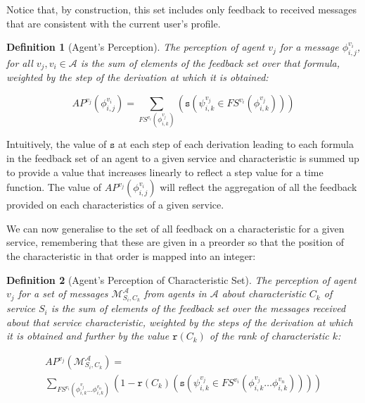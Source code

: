 \documentclass[compsoc, conference, letterpaper, 10pt, times]{IEEEtran}
\newtheorem{definition}{Definition}
\begin{document}
Notice that, by construction, this set includes only feedback to received messages that are consistent with the current user's profile. 

\begin{definition}[Agent's Perception]
The perception of agent $v_{j}$ for a message $\phi^{v_{i}}_{i,j}$, for all $v_{j}, v_{i} \in \mathcal{A}$ is the sum of elements of the feedback set over that formula, weighted by the step of the derivation at which it is obtained: 

\[
AP^{v_{j}}(\phi^{v_{i}}_{i,j})=\sum_{FS^{v_{i}}(\phi^{v_{j}}_{i,k})}(\mathtt{s}(\psi^{v_{j}}_{i,k} \in FS^{v_{i}}(\phi^{v_{j}}_{i,k})))
\]

\end{definition}

Intuitively, the value of $\mathtt{s}$ at each step of each derivation leading to each formula in the feedback set of an agent to a given service and characteristic is summed up to provide a value that increases linearly to reflect a step value for a time function. The value of $AP^{v_{j}}(\phi^{v_{i}}_{i,j})$ will reflect the aggregation of all the feedback provided on each characteristics of a given service.  


We can now generalise to the set of all feedback on a characteristic for a given service, remembering that these are given in a preorder so that the position of the characteristic in that order is mapped into an integer:


\begin{definition}[Agent's Perception of Characteristic Set]
The perception of agent $v_{j}$ for a set of messages $\mathcal{M}^{\mathcal{A}}_{S_{i},C_{k}}$ from agents in $\mathcal{A}$ about characteristic $C_{k}$ of service $S_{i}$
is the sum of elements of the feedback set over the messages received about that service characteristic, weighted by the steps of the derivation at which it is obtained and further by the value $\mathtt{r}(C_{k})$ of the rank of characteristic $k$: 


\begin{displaymath}
\begin{array}{l}

AP^{v_{j}}(\mathcal{M}^{\mathcal{A}}_{S_{i}, C_{k}})=\\
\sum_{FS^{v_{i}}(\phi^{v_{j}}_{i,k}\dots \phi^{v_{n}}_{i,k})}
(1-\mathtt{r}(C_{k})(\mathtt{s}(\psi^{v_{j}}_{i,k} \in FS^{v_{i}}(\phi^{v_{j}}_{i,k}\dots \phi^{v_{n}}_{i,k}))))
\end{array}
\end{displaymath}

\end{definition}
\end{document}
